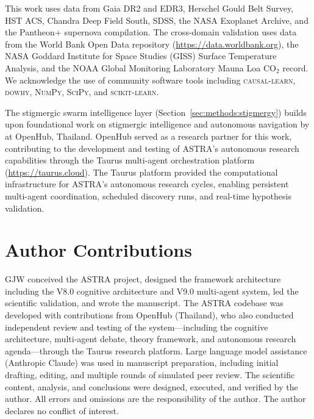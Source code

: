 \documentclass[usenatbib]{rasti}
\begin{document}
This work uses data from Gaia DR2 and EDR3, Herschel Gould Belt Survey, HST ACS, Chandra Deep Field South, SDSS, the NASA Exoplanet Archive, and the Pantheon+ supernova compilation.
The cross-domain validation uses data from the World Bank Open Data repository (\url{https://data.worldbank.org}), the NASA Goddard Institute for Space Studies (GISS) Surface Temperature Analysis, and the NOAA Global Monitoring Laboratory Mauna Loa CO$_{2}$ record.
We acknowledge the use of community software tools including \textsc{causal-learn}, \textsc{dowhy}, \textsc{NumPy}, \textsc{SciPy}, and \textsc{scikit-learn}.

The stigmergic swarm intelligence layer (Section~\ref{sec:methods:stigmergy}) builds upon foundational work on stigmergic intelligence and autonomous navigation by \citet{Dey2025} at OpenHub, Thailand.
OpenHub served as a research partner for this work, contributing to the development and testing of ASTRA's autonomous research capabilities through the Taurus multi-agent orchestration platform (\url{https://taurus.cloud}).
The Taurus platform provided the computational infrastructure for ASTRA's autonomous research cycles, enabling persistent multi-agent coordination, scheduled discovery runs, and real-time hypothesis validation.

\section*{Author Contributions}

GJW conceived the ASTRA project, designed the framework architecture including the V8.0 cognitive architecture and V9.0 multi-agent system, led the scientific validation, and wrote the manuscript.
The ASTRA codebase was developed with contributions from OpenHub (Thailand), who also conducted independent review and testing of the system---including the cognitive architecture, multi-agent debate, theory framework, and autonomous research agenda---through the Taurus research platform.
Large language model assistance (Anthropic Claude) was used in manuscript preparation, including initial drafting, editing, and multiple rounds of simulated peer review.
The scientific content, analysis, and conclusions were designed, executed, and verified by the author.
All errors and omissions are the responsibility of the author.
The author declares no conflict of interest.
\end{document}
